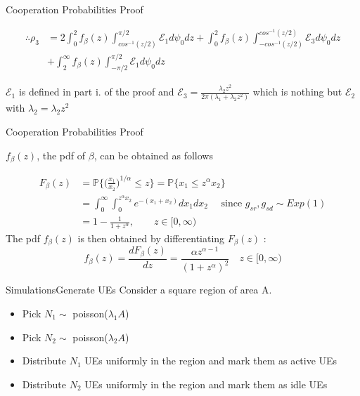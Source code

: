 \documentclass{beamer}
\begin{document}
\begin{frame}{Cooperation Probabilities} {Proof}

\begin{align*}
\therefore \rho_3&= 2 \int_0^2 f_{\beta}(z)\int^{\pi/2}_{cos^{-1}(z/2)}\mathcal{E}_1 d\psi_0 dz  +\int_0^2 f_{\beta}(z)\int_{-cos^{-1}(z/2)}^{cos^{-1}(z/2)}\mathcal{E}_3 d\psi_0dz \\
&+ \int_2^{\infty} f_{\beta}(z)\int_{-\pi/2}^{\pi/2}\mathcal{E}_1 d\psi_0 dz \label{eq:corrected}
\end{align*}

$\mathcal{E}_1$ is defined in part i. of the proof and  $\mathcal{E}_3 = \frac{\lambda_2 z^2}{2\pi(\lambda_1+\lambda_2z^2)}$ which is nothing but $\mathcal{E}_2$ with $\lambda_2 = \lambda_2z^2$
\end{frame}

\begin{frame}{Cooperation Probabilities} {Proof}

$f_\beta(z)$, the pdf of $\beta$, can be obtained as follows

\begin{align*}
F_\beta(z) &= \mathbb{P}\bigg\{ \bigg( \frac{x_1}{x_2}\bigg)^{1/\alpha} \leq z \bigg\} = \mathbb{P} \{ x_1\leq z^\alpha x_2\} \\
&= \int_0^\infty \int_0^{z^\alpha x_2} e^{-(x_1+x_2)} dx_1dx_2 \quad \text{ since } g_{sr},g_{sd} \sim Exp(1) \\ 
&= 1-\frac{1}{1+z^\alpha}, \qquad z \in [0,\infty)
\end{align*}
The pdf $f_\beta(z)$ is then obtained by differentiating $F_\beta(z)$ :
\begin{equation*}
    f_\beta(z) = \frac{dF_\beta(z)}{dz} = \frac{\alpha z^{\alpha-1}}{(1+z^\alpha)^2} \quad z \in [0,\infty)
\end{equation*}


\end{frame}





\begin{frame}{Simulations}{Generate UEs}
Consider a square region of area A. 
\begin{itemize}
\item  Pick $N_1 \sim $ poisson($\lambda_1 A$)
\item  Pick $N_2 \sim $ poisson($\lambda_2 A$)
\item Distribute $N_1$ UEs uniformly in the region and mark them as active UEs
\item Distribute $N_2$ UEs uniformly in the region and mark them as idle UEs
\end{itemize}
\end{frame}
\end{document}
